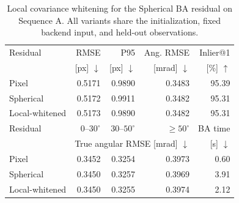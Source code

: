 \begin{table}[t]
\centering
\caption{Local covariance whitening for the Spherical BA residual on Sequence A. All variants share the initialization, fixed backend input, and held-out observations.}
\label{tab:local_whitened_spherical}
\footnotesize
\setlength{\tabcolsep}{2.3pt}
\renewcommand{\arraystretch}{1.05}
\begin{tabular}{@{}lrrrr@{}}
\toprule
Residual & RMSE & P95 & Ang. RMSE & Inlier@1 \\
 & [px] $\downarrow$ & [px] $\downarrow$ & [mrad] $\downarrow$ & [\%] $\uparrow$ \\
\midrule
Pixel & 0.5171 & 0.9890 & 0.3483 & 95.39 \\
Spherical & 0.5172 & 0.9911 & 0.3482 & 95.31 \\
Local-whitened & 0.5173 & 0.9890 & 0.3482 & 95.31 \\
\midrule
Residual & $0$--$30^\circ$ & $30$--$50^\circ$ & $\geq50^\circ$ & BA time \\
 & \multicolumn{3}{c}{True angular RMSE [mrad] $\downarrow$} & [s] $\downarrow$ \\
\midrule
Pixel & 0.3452 & 0.3254 & 0.3973 & 0.60 \\
Spherical & 0.3450 & 0.3257 & 0.3969 & 3.91 \\
Local-whitened & 0.3450 & 0.3255 & 0.3974 & 2.12 \\
\bottomrule
\end{tabular}
\end{table}
